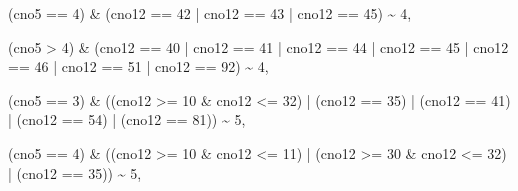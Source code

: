 \documentclass[
]{book}
\newenvironment{Shaded}{\begin{snugshade}}{\end{snugshade}}
\newcommand{\DecValTok}[1]{\textcolor[rgb]{0.00,0.00,0.81}{#1}}
\newcommand{\NormalTok}[1]{#1}
\newcommand{\SpecialCharTok}[1]{\textcolor[rgb]{0.00,0.00,0.00}{#1}}
\begin{document}
\begin{Shaded}
\begin{Highlighting}[]
\NormalTok{                        (cno5 }\SpecialCharTok{==} \DecValTok{4}\NormalTok{) }\SpecialCharTok{\&}\NormalTok{ (cno12 }\SpecialCharTok{==} \DecValTok{42} \SpecialCharTok{|}\NormalTok{ cno12 }\SpecialCharTok{==} \DecValTok{43} \SpecialCharTok{|}\NormalTok{ cno12 }\SpecialCharTok{==} \DecValTok{45}\NormalTok{) }\SpecialCharTok{\textasciitilde{}} \DecValTok{4}\NormalTok{,}
                        
\NormalTok{                        (cno5 }\SpecialCharTok{\textgreater{}} \DecValTok{4}\NormalTok{) }\SpecialCharTok{\&}\NormalTok{ (cno12 }\SpecialCharTok{==} \DecValTok{40} \SpecialCharTok{|}\NormalTok{ cno12 }\SpecialCharTok{==} \DecValTok{41} \SpecialCharTok{|}\NormalTok{ cno12 }\SpecialCharTok{==} \DecValTok{44} \SpecialCharTok{|}\NormalTok{ cno12 }\SpecialCharTok{==} \DecValTok{45} \SpecialCharTok{|} 
\NormalTok{                        cno12 }\SpecialCharTok{==} \DecValTok{46} \SpecialCharTok{|}\NormalTok{ cno12 }\SpecialCharTok{==} \DecValTok{51} \SpecialCharTok{|}\NormalTok{ cno12 }\SpecialCharTok{==} \DecValTok{92}\NormalTok{) }\SpecialCharTok{\textasciitilde{}} \DecValTok{4}\NormalTok{,}
                        
\NormalTok{                        (cno5 }\SpecialCharTok{==} \DecValTok{3}\NormalTok{) }\SpecialCharTok{\&}\NormalTok{ ((cno12 }\SpecialCharTok{\textgreater{}=} \DecValTok{10} \SpecialCharTok{\&}\NormalTok{ cno12 }\SpecialCharTok{\textless{}=} \DecValTok{32}\NormalTok{) }\SpecialCharTok{|}\NormalTok{ (cno12 }\SpecialCharTok{==} \DecValTok{35}\NormalTok{) }\SpecialCharTok{|}\NormalTok{ (cno12 }\SpecialCharTok{==} \DecValTok{41}\NormalTok{) }\SpecialCharTok{|} 
\NormalTok{                        (cno12 }\SpecialCharTok{==} \DecValTok{54}\NormalTok{) }\SpecialCharTok{|}\NormalTok{ (cno12 }\SpecialCharTok{==} \DecValTok{81}\NormalTok{)) }\SpecialCharTok{\textasciitilde{}} \DecValTok{5}\NormalTok{,}
                        
\NormalTok{                        (cno5 }\SpecialCharTok{==} \DecValTok{4}\NormalTok{) }\SpecialCharTok{\&}\NormalTok{ ((cno12 }\SpecialCharTok{\textgreater{}=} \DecValTok{10} \SpecialCharTok{\&}\NormalTok{ cno12 }\SpecialCharTok{\textless{}=} \DecValTok{11}\NormalTok{) }\SpecialCharTok{|}\NormalTok{ (cno12 }\SpecialCharTok{\textgreater{}=} \DecValTok{30} \SpecialCharTok{\&}\NormalTok{ cno12 }\SpecialCharTok{\textless{}=} \DecValTok{32}\NormalTok{) }\SpecialCharTok{|} 
\NormalTok{                        (cno12 }\SpecialCharTok{==} \DecValTok{35}\NormalTok{)) }\SpecialCharTok{\textasciitilde{}} \DecValTok{5}\NormalTok{,}
                        

\end{Highlighting}
\end{Shaded}
\end{document}
